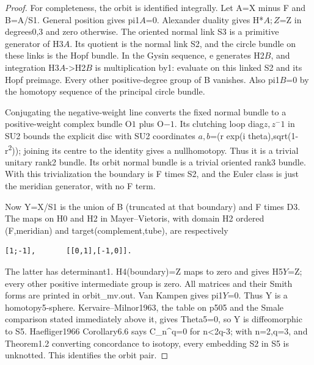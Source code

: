\begin{proof}
For completeness, the orbit is identified integrally. Let A=X minus F and B=A/S1. General position gives pi1\(A\)=0. Alexander duality gives H*\(A;Z\)=Z in degrees0,3 and zero otherwise. The oriented normal link S3 is a primitive generator of H3\(A\). Its quotient is the normal link S2, and the circle bundle on these links is the Hopf bundle. In the Gysin sequence, e generates H2\(B\), and integration H3\(A\)-\textgreater H2\(B\) is multiplication by1: evaluate on this linked S2 and its Hopf preimage. Every other positive-degree group of B vanishes. Also pi1\(B\)=0 by the homotopy sequence of the principal circle bundle.

Conjugating the negative-weight line converts the fixed normal bundle to a positive-weight complex bundle O\(1\) plus O\(-1\). Its clutching loop diag\(z,z^-1\) in SU2 bounds the explicit disc with SU2 coordinates \(a,b\)=(r exp(i theta),sqrt(1-r\textsuperscript{2})); joining its centre to the identity gives a nullhomotopy. Thus it is a trivial unitary rank2 bundle. Its orbit normal bundle is a trivial oriented rank3 bundle. With this trivialization the boundary is F times S2, and the Euler class is just the meridian generator, with no F term.

Now Y=X/S1 is the union of B (truncated at that boundary) and F times D3. The maps on H0 and H2 in Mayer--Vietoris, with domain H2 ordered (F,meridian) and target(complement,tube), are respectively

\begin{lstlisting}
[1;-1],       [[0,1],[-1,0]].
\end{lstlisting}

The latter has determinant1. H4(boundary)=Z maps to zero and gives H5\(Y\)=Z; every other positive intermediate group is zero. All matrices and their Smith forms are printed in orbit\_mv.out. Van Kampen gives pi1\(Y\)=0. Thus Y is a homotopy5-sphere. Kervaire--Milnor1963, the table on p505 and the Smale comparison stated immediately above it, gives Theta5=0, so Y is diffeomorphic to S5. Haefliger1966 Corollary6.6 says C\_n\^{}q=0 for n\textless2q-3; with n=2,q=3, and Theorem1.2 converting concordance to isotopy, every embedding S2 in S5 is unknotted. This identifies the orbit pair.


\end{proof}

